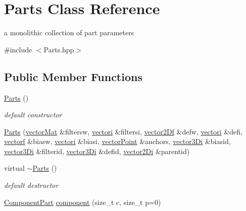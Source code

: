 \hypertarget{class_parts}{\section{Parts Class Reference}
\label{class_parts}
}


a monolithic collection of part parameters  




{\ttfamily \#include $<$Parts.\-hpp$>$}

\subsection*{Public Member Functions}
\begin{DoxyCompactItemize}
\item 
\hyperlink{class_parts_a02ffe7271c4e268ee934710f91a203eb}{Parts} ()
\begin{DoxyCompactList}\small\item\em default constructor \end{DoxyCompactList}\item 
\hyperlink{class_parts_ac8e1ad21c900825480d3f0e241808757}{Parts} (\hyperlink{types_8hpp_a3207a7addcfa415d1c83622febcb1e9b}{vector\-Mat} \&filtersw, \hyperlink{types_8hpp_a44529587d60e73bf0e689a82e5e70a55}{vectori} \&filtersi, \hyperlink{types_8hpp_a94f2d563f3725231a6f684b4dce4f1ef}{vector2\-Df} \&defw, \hyperlink{types_8hpp_a44529587d60e73bf0e689a82e5e70a55}{vectori} \&defi, \hyperlink{types_8hpp_a4da5db3ee9e284f719ef5764dbadffc8}{vectorf} \&biasw, \hyperlink{types_8hpp_a44529587d60e73bf0e689a82e5e70a55}{vectori} \&biasi, \hyperlink{types_8hpp_ac468fcf6870d6563ac8fa3669845afcc}{vector\-Point} \&anchors, \hyperlink{types_8hpp_a1f7c8ad00a53fb2d61b3656da9a6581d}{vector3\-Di} \&biasid, \hyperlink{types_8hpp_a1f7c8ad00a53fb2d61b3656da9a6581d}{vector3\-Di} \&filterid, \hyperlink{types_8hpp_a1f7c8ad00a53fb2d61b3656da9a6581d}{vector3\-Di} \&defid, \hyperlink{types_8hpp_a93a5e2cfd40d1ff1f10d8bbf11884c41}{vector2\-Di} \&parentid)
\item 
virtual \hyperlink{class_parts_ac2df1f1a1d41444dff8ed4d4343aa64d}{$\sim$\-Parts} ()
\begin{DoxyCompactList}\small\item\em default destructor \end{DoxyCompactList}\item 
\hyperlink{class_component_part}{Component\-Part} \hyperlink{class_parts_ae4cd6034cce85efe0fa1b55bf5b2da47}{component} (size\-\_\-t c, size\-\_\-t p=0)

\end{DoxyCompactItemize}

